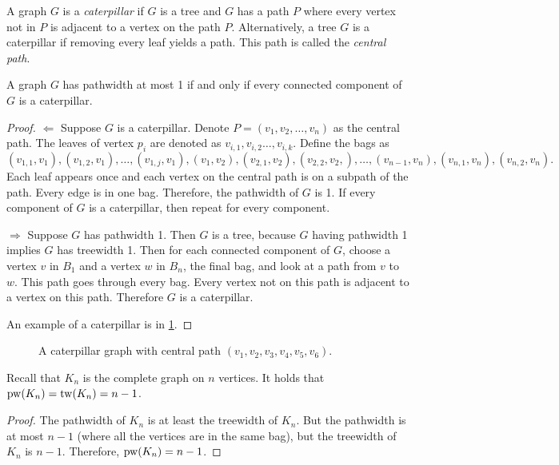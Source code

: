 A graph \(G\) is a \textit{caterpillar} if \(G\) is a tree and $G$ has a path \(P\) where every vertex not in $P$ is adjacent to a vertex on the path \(P\). Alternatively, a tree \(G\) is a caterpillar if removing every leaf yields a path. This path is called the \textit{central path}.
\begin{proposition}
	A graph $G$ has pathwidth at most 1 if and only if every connected component of $G$ is a caterpillar.
\end{proposition}
\begin{proof}
	$\Leftarrow$ Suppose \(G\) is a caterpillar.
	Denote \(P =\left( v_1, v_2, \ldots, v_n\right)\) as the central path. The leaves of vertex \(p_i\) are denoted as \(v_{i, 1}, v_{i, 2} \dots, v_{i, k}\). Define the bags as
	\begin{equation*}
		(v_{1, 1}, v_1), (v_{1, 2}, v_1) ,\ldots ,(v_{1, j}, v_1),  (v_1, v_2), (v_{2, 1}, v_2), (v_{2,2}, v_2,),\ldots ,(v_{n-1}, v_n), (v_{n,1}, v_n), (v_{n,2}, v_n) .
	\end{equation*}
	Each leaf appears once and each vertex on the central path is on a subpath of the path. Every edge is in one bag. Therefore, the pathwidth of \(G\) is 1. If every component of $G$ is a caterpillar, then repeat for every component.

	$\Rightarrow$ Suppose \(G\) has pathwidth 1. Then $G$ is a tree, because $G$ having pathwidth 1 implies $G$ has treewidth 1. Then for each connected component of \(G\), choose a vertex \(v\) in \(B_1\) and a vertex \(w\) in \(B_n\), the final bag, and look at a path from \(v\) to \(w\). This path goes through every bag. Every vertex not on this path is adjacent to a vertex on this path. Therefore $G$ is a caterpillar. 
	
	An example of a caterpillar is in \cref{fig:caterpillar}.
\end{proof}
\begin{figure}[h!]
	\centering
	
	\caption[Caterpillar graph]{A caterpillar graph with central path \((v_1, v_2, v_3, v_4, v_5, v_6)\).}\label{fig:caterpillar}
\end{figure}

\begin{example}
	Recall that $K_n$ is the complete graph on $n$ vertices. It holds that \(\operatorname{pw}(K_n) = \operatorname{tw}(K_n) = n - 1\).
\end{example}
\begin{proof}
	The pathwidth of \(K_n\) is at least the treewidth of \(K_n\). But the pathwidth is at most \(n- 1\) (where all the vertices are in the same bag), but the treewidth of \(K_n\) is \(n - 1\). Therefore, \(\operatorname{pw}(K_n) = n - 1\).
\end{proof}

